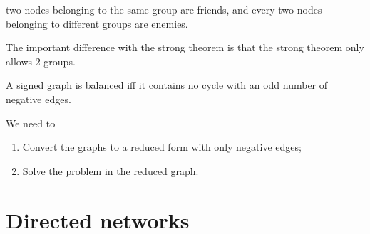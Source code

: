 \documentclass[a4paper,9pt]{extarticle}
\begin{document}
\begin{multicols*}{2}
\begin{riquadro}
			two nodes belonging to the same group are friends, and every two nodes belonging to
			different groups are enemies.
		\end{riquadro}
		The important difference with the strong theorem is that the strong theorem only allows 2 groups.
		\begin{riquadro}
			A signed graph is balanced iff it contains no cycle with an odd number of
			negative edges.
		\end{riquadro}
		We need to 
		\begin{enumerate}
			\item Convert the graphs to a reduced form with only negative edges;
			\item Solve the problem in the reduced graph.
		\end{enumerate}
		\section{Directed networks}

\end{multicols*}
\end{document}
